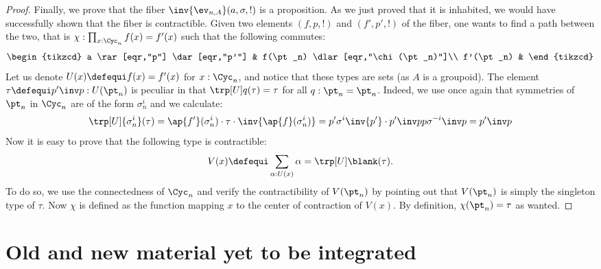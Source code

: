 \begin{proof}
  Finally, we prove that the fiber $\inv{\ev_{n,A}}(a,\sigma,!)$ is a
  proposition. As we just proved that it is inhabited, we would have
  successfully shown that the fiber is contractible. Given two elements
  $(f,p,!)$ and $(f',p',!)$ of the fiber, one wants to find a path between the
  two, that is $\chi:\prod_{x:\Cyc_n} f(x) = f'(x)$ such that the following
  commutes:
  \begin{displaymath}
    \begin{tikzcd}
      a \rar[eqr,"p"] \dar[eqr,"p'"] & f(\pt_n) \dlar[eqr,"\chi(\pt_n)"]\\
      f'(\pt_n) & 
    \end{tikzcd}
  \end{displaymath}
  Let us denote $U(x)\defequi f(x) = f'(x)$ for $x:\Cyc_n$, and notice that
  these types are sets (as $A$ is a groupoid). The element $\tau\defequi p'\inv
  p : U(\pt_n)$ is peculiar in that  $\trp[U] q (\tau) = \tau$ for all $q:\pt_n=\pt_n$. Indeed, we use once
  again that symmetries of $\pt_n$ in $\Cyc_n$ are of the form $\sigma_n^i$ and
  we calculate:
  \begin{displaymath}
    \trp[U] {\sigma_n^i} (\tau) = \ap {f'} (\sigma_n^i) \cdot \tau \cdot \inv{\ap {f}(\sigma_n^i)}
    = p' \sigma^i \inv {p'} \cdot p'\inv p p \sigma^{-i} \inv p = p' \inv p
  \end{displaymath}
  Now it is easy to prove that the following type is contractible:
  \begin{displaymath}
    V(x) \defequi \sum_{\alpha: U(x)} \alpha = \trp[U] \blank (\tau).
  \end{displaymath}
  To do so, we use the connectedness of $\Cyc_n$ and verify the contractibility
  of $V(\pt_n)$ by pointing out that $V(\pt_n)$ is simply the singleton type of
  $\tau$. Now $\chi$ is defined as the function mapping $x$ to the center of
  contraction of $V(x)$. By definition, $\chi(\pt_n) = \tau$ as wanted.
\end{proof}

\section{Old and new material yet to be integrated}
\label{sec:deckS1}

